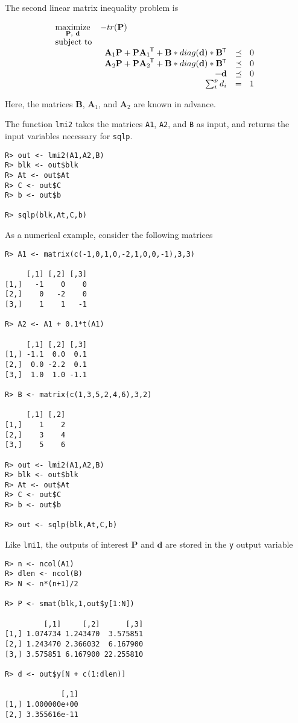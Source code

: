 \documentclass{article}
\newcommand{\ve}[1]{\mathbf{#1}}           %
\newcommand{\m}[1]{\mathbf{#1}}               %
\newcommand{\tr}[1]{{#1}^{\mkern-1.5mu\mathsf{T}}}              %
\begin{document}
The second linear matrix inequality problem is

\[
\begin{array}{ll}
\underset{\m{P},~\ve{d}}{\text{maximize}} & -tr(\m{P}) \\
\text{subject to} & \\
& \begin{array}{rl}
\m{A}_{1}\m{P} + \m{P}\tr{\m{A}_{1}} + \m{B}*diag(\ve{d})*\tr{\m{B}} &\preceq~~ 0 \\
\m{A}_{2}\m{P} + \m{P}\tr{\m{A}_{2}} + \m{B}*diag(\ve{d})*\tr{\m{B}} &\preceq~~ 0 \\
-\ve{d} &\preceq~~ 0 \\
\sum_{i}^{p} d_{i}  &=~~ 1
\end{array}
\end{array}
\]

Here, the matrices $\m{B}$, $\m{A}_{1}$, and $\m{A}_{2}$ are known in advance. 

The function \verb!lmi2! takes the matrices \verb!A1!, \verb!A2!, and \verb!B! as input, and returns the input variables necessary for \verb!sqlp!.

\begin{verbatim}
R> out <- lmi2(A1,A2,B)
R> blk <- out$blk
R> At <- out$At
R> C <- out$C
R> b <- out$b

R> sqlp(blk,At,C,b)
\end{verbatim}

As a numerical example, consider the following matrices

\begin{verbatim}
R> A1 <- matrix(c(-1,0,1,0,-2,1,0,0,-1),3,3)

     [,1] [,2] [,3]
[1,]   -1    0    0
[2,]    0   -2    0
[3,]    1    1   -1

R> A2 <- A1 + 0.1*t(A1)

     [,1] [,2] [,3]
[1,] -1.1  0.0  0.1
[2,]  0.0 -2.2  0.1
[3,]  1.0  1.0 -1.1

R> B <- matrix(c(1,3,5,2,4,6),3,2)

     [,1] [,2]
[1,]    1    2
[2,]    3    4
[3,]    5    6

R> out <- lmi2(A1,A2,B)
R> blk <- out$blk
R> At <- out$At
R> C <- out$C
R> b <- out$b

R> out <- sqlp(blk,At,C,b)
\end{verbatim}

Like \verb!lmi1!, the outputs of interest $\m{P}$ and $\ve{d}$ are stored in the \verb!y! output variable

\begin{verbatim}
R> n <- ncol(A1)
R> dlen <- ncol(B)
R> N <- n*(n+1)/2

R> P <- smat(blk,1,out$y[1:N])

         [,1]     [,2]      [,3]
[1,] 1.074734 1.243470  3.575851
[2,] 1.243470 2.366032  6.167900
[3,] 3.575851 6.167900 22.255810

R> d <- out$y[N + c(1:dlen)]

             [,1]
[1,] 1.000000e+00
[2,] 3.355616e-11
\end{verbatim}
\end{document}
